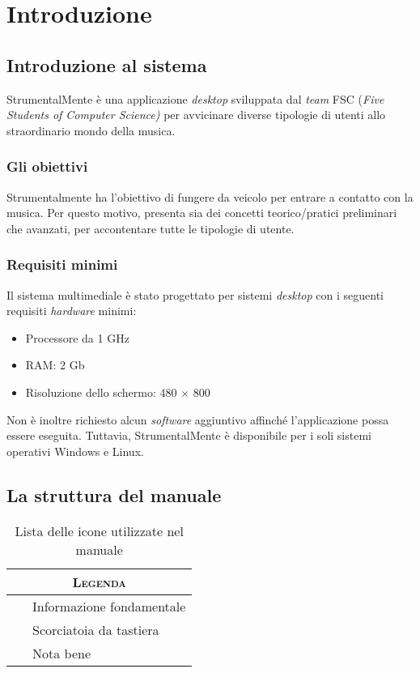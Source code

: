 \chapter{Introduzione}

\section{Introduzione al sistema}

StrumentalMente è una applicazione \emph{desktop} sviluppata dal \emph{team} FSC
(\emph{Five Students of Computer Science)} per avvicinare diverse tipologie di
utenti allo straordinario mondo della musica.

\subsection{Gli obiettivi}

Strumentalmente ha l'obiettivo di fungere da veicolo per entrare a contatto con
la musica. Per questo motivo, presenta sia dei concetti teorico/pratici
preliminari che avanzati, per accontentare tutte le tipologie di utente.

\subsection{Requisiti minimi}

Il sistema multimediale è stato progettato per sistemi \textit{desktop} con i
seguenti requisiti \emph{hardware} minimi:
\begin{itemize}
	\item Processore da 1 GHz
	\item RAM: 2 Gb
	\item Risoluzione dello schermo: 480 $\times$ 800
\end{itemize}
Non è inoltre richiesto alcun \textit{software} aggiuntivo affinché
l'applicazione possa essere eseguita. Tuttavia, StrumentalMente è disponibile
per i soli sistemi operativi \textsf{Windows} e \textsf{Linux}.

\section{La struttura del manuale}

\begin{table}[H]
	\centering
	\begin{tabular}{@{}l@{}}
		\toprule
		\multicolumn{1}{c}{\textsc{\textbf{Legenda}}}\\
		\midrule
		{\Large\faInfoCircle{}}~~~Informazione fondamentale\\
		\midrule
		{\Large\faKeyboardO{}}~~~Scorciatoia da tastiera\\
		\midrule
		{\Large\faWarning{}}~~~Nota bene\\
		\bottomrule
	\end{tabular}
	\caption{Lista delle icone utilizzate nel manuale}
	\label{tab:icons}
\end{table}

